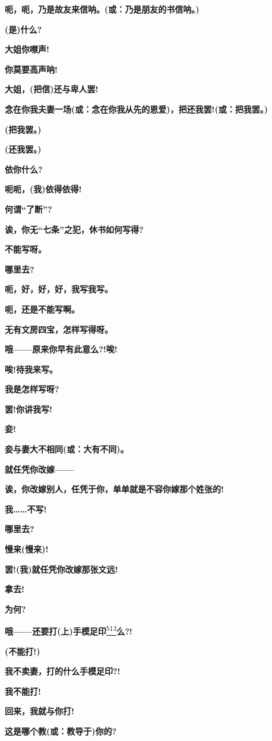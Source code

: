 \textbf{呃，呃，乃是故友来信呐。(或：乃是朋友的书信呐。)}

\textbf{(是)什么?}

\textbf{大姐你噤声!}

\textbf{你莫要高声呐!}

\textbf{大姐，(把信)还与卑人罢!}

\textbf{念在你我夫妻一场(或：念在你我从先的恩爱)，把还我罢!(或：把我罢。)}

\textbf{(把我罢。)}

\textbf{(还我罢。)}

\textbf{依你什么?}

\textbf{呃呃，(我)依得依得!}

\textbf{何谓``了断''?}

\textbf{诶，你无``七条''之犯，休书如何写得?}

\textbf{不能写呀。}

\textbf{哪里去?}

\textbf{呃，好，好，好，我写我写。}

\textbf{呃，还是不能写啊。}

\textbf{无有文房四宝，怎样写得呀。}

\textbf{哦------原来你早有此意么?!唉!}

\textbf{唉!待我来写。}

\textbf{我是怎样写呀?}

\textbf{罢!你讲我写!}

\textbf{妾!}

\textbf{妾与妻大不相同(或：大有不同)。}

\textbf{就任凭你改嫁------}

\textbf{诶，你改嫁别人，任凭于你，单单就是不容你嫁那个姓张的!}

\textbf{我\ldots{}\ldots{}不写!}

\textbf{哪里去?}

\textbf{慢来(慢来)!}

\textbf{罢!(我)就任凭你改嫁那张文远!}

\textbf{拿去!}

\textbf{为何?}

\textbf{哦------还要打(上)手模足印}\protect\hyperlink{fn513}{\textsuperscript{513}}\textbf{么?!}

\textbf{(不能打!)}

\textbf{我不卖妻，打的什么手模足印?!}

\textbf{我不能打!}

\textbf{回来，我就与你打!}

\textbf{这是哪个教(或：教导于)你的?}

